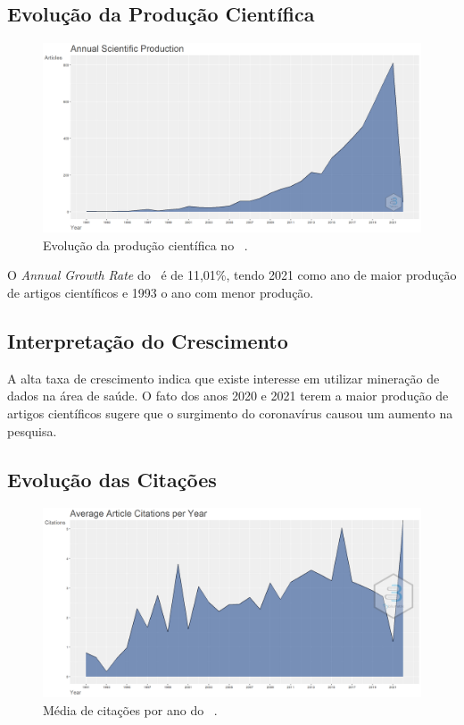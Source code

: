 \subsection{Evolução da Produção Científica}

\begin{figure}
    \centering
    \includegraphics[width=1\textwidth]{experiments/vinis-caixe/PesqBibliogr/MineracaoDados/WoS-20220204/Dataset/AnnualScientificProduction-2022-02-06.png}
    \caption{Evolução da produção científica no \dataset\ .}
    \label{fig:evol:anual:vinis-caixe}
\end{figure}

O \textit{Annual Growth Rate} do \dataset\ é de 11,01\%, tendo 2021 como ano de maior produção de artigos científicos e 1993 o ano com menor produção.

\subsection{Interpretação do Crescimento}

A alta taxa de crescimento indica que existe interesse em utilizar mineração de dados na área de saúde. O fato dos anos 2020 e 2021 terem a maior produção de artigos científicos sugere que o surgimento do coronavírus causou um aumento na pesquisa.

\subsection{Evolução das Citações}

\begin{figure}
    \centering
    \includegraphics[width=1\textwidth]{experiments/vinis-caixe/PesqBibliogr/MineracaoDados/WoS-20220204/Dataset/AverageArticleCitationPerYear-2022-02-08.png}
    \caption{Média de citações por ano do \dataset\ .}
    \label{fig:cit:anual:vinis-caixe}
\end{figure}